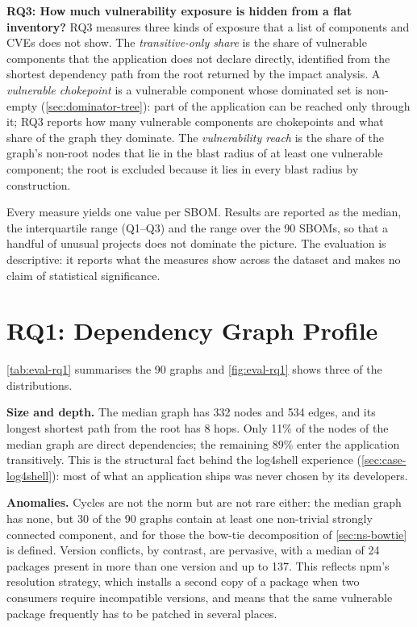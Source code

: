 \textbf{RQ3: How much vulnerability exposure is hidden from a flat inventory?} RQ3 measures three kinds of exposure that a list of components and CVEs does not show. The \textit{transitive-only share} is the share of vulnerable components that the application does not declare directly, identified from the shortest dependency path from the root returned by the impact analysis. A \textit{vulnerable chokepoint} is a vulnerable component whose dominated set is non-empty (\autoref{sec:dominator-tree}): part of the application can be reached only through it; RQ3 reports how many vulnerable components are chokepoints and what share of the graph they dominate. The \textit{vulnerability reach} is the share of the graph's non-root nodes that lie in the blast radius of at least one vulnerable component; the root is excluded because it lies in every blast radius by construction.

Every measure yields one value per SBOM. Results are reported as the median, the interquartile range (Q1--Q3) and the range over the 90 SBOMs, so that a handful of unusual projects does not dominate the picture. The evaluation is descriptive: it reports what the measures show across the dataset and makes no claim of statistical significance.


\section{RQ1: Dependency Graph Profile}
\label{sec:eval-rq1}

\autoref{tab:eval-rq1} summarises the 90 graphs and \autoref{fig:eval-rq1} shows three of the distributions.



\textbf{Size and depth.} The median graph has 332 nodes and 534 edges, and its longest shortest path from the root has 8 hops. Only 11\% of the nodes of the median graph are direct dependencies; the remaining 89\% enter the application transitively. This is the structural fact behind the log4shell experience (\autoref{sec:case-log4shell}): most of what an application ships was never chosen by its developers.

\textbf{Anomalies.} Cycles are not the norm but are not rare either: the median graph has none, but 30 of the 90 graphs contain at least one non-trivial strongly connected component, and for those the bow-tie decomposition of \autoref{sec:ns-bowtie} is defined. Version conflicts, by contrast, are pervasive, with a median of 24 packages present in more than one version and up to 137. This reflects npm's resolution strategy, which installs a second copy of a package when two consumers require incompatible versions, and means that the same vulnerable package frequently has to be patched in several places.

